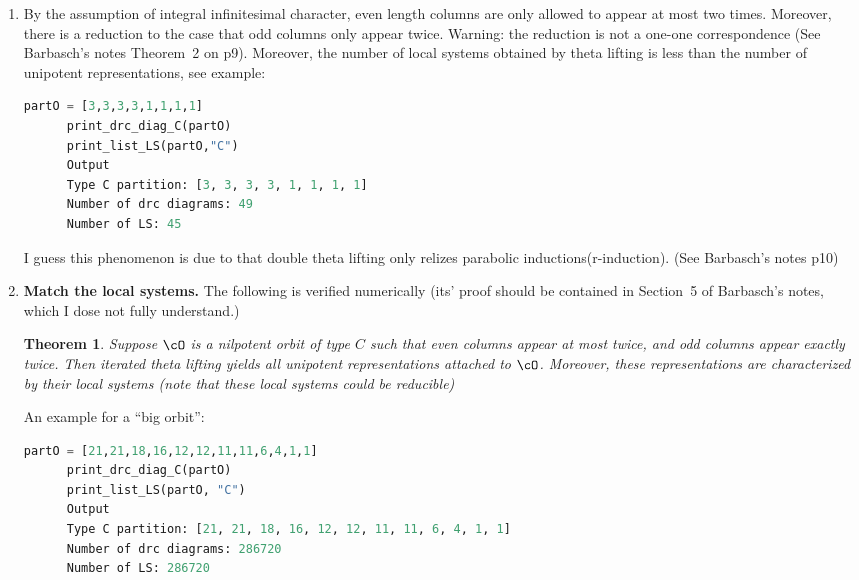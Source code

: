 \documentclass[12pt,a4paper]{amsart}
\numberwithin{equation}{section}
\newtheorem{thm}{Theorem}[section]
\theoremstyle{remark}
\begin{document}
\begin{enumerate}
\begin{enumerate}
  \item By the assumption of integral infinitesimal character, even length
    columns are only allowed to appear at most two times. Moreover, there is a
    reduction to the case that odd columns only appear twice.  {\color{blue}
      Warning: the reduction is not a one-one correspondence (See Barbasch's
      notes Theorem~2 on p9). } Moreover, the number of local systems obtained
    by theta lifting is less than the number of unipotent representations, see
    example:
    \begin{lstlisting}[language=Python]
      partO = [3,3,3,3,1,1,1,1]
      print_drc_diag_C(partO)
      print_list_LS(partO,"C")
      Output
      Type C partition: [3, 3, 3, 3, 1, 1, 1, 1]
      Number of drc diagrams: 49
      Number of LS: 45
    \end{lstlisting}
    I guess this phenomenon is due to that double theta lifting only relizes 
    parabolic inductions(r-induction). (See Barbasch's notes p10)
  \item {\bfseries Match the local systems.} The following is verified
    numerically  
    (its' proof should be contained in Section~5 of
    Barbasch's notes, which I dose not fully understand.)
    \begin{thm}\label{thm:count.C}
      Suppose $\cO$ is a nilpotent orbit of type $C$ such that even
      columns appear at most twice, and odd columns appear exactly twice.  Then
      iterated theta lifting yields all unipotent representations attached to
      $\cO$. Moreover, these representations are characterized by their local
      systems (note that these local systems could be reducible)
    \end{thm}
    An example for a ``big orbit'':
    \begin{lstlisting}[language=Python]
      partO = [21,21,18,16,12,12,11,11,6,4,1,1]
      print_drc_diag_C(partO)
      print_list_LS(partO, "C")
      Output
      Type C partition: [21, 21, 18, 16, 12, 12, 11, 11, 6, 4, 1, 1]
      Number of drc diagrams: 286720
      Number of LS: 286720
    \end{lstlisting}
  \end{enumerate}


\end{enumerate}
\end{document}
